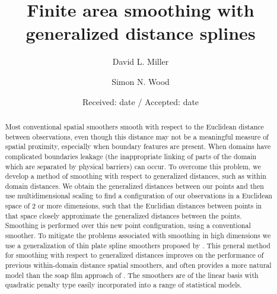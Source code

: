 \documentclass[smallextended]{svjour3}       %
\begin{document}
\title{Finite area smoothing with generalized distance splines}


\author{David L. Miller         \and
        Simon N. Wood
}



\date{Received: date / Accepted: date}


\maketitle

\begin{abstract}
Most conventional spatial smoothers smooth with respect to the Euclidean distance between observations, even though this distance may not be a meaningful measure of spatial proximity, especially when boundary features are present. When domains have complicated boundaries leakage (the inappropriate linking of parts of the domain which are separated by physical barriers) can occur. To overcome this problem, we develop a method of smoothing with respect to generalized distances, such as within domain distances. We obtain the generalized distances between our points and then use multidimensional scaling to find a configuration of our observations in a Euclidean space of 2 or more dimensions, such that the Euclidian distances between points in that space closely approximate the generalized distances between the points. Smoothing is performed over this new point configuration, using a conventional smoother. To mitigate the problems associated with smoothing in high dimensions we use a generalization of thin plate spline smoothers proposed by \cite{Duchon:1977tr}. This general method for smoothing with respect to generalized distances improves on the performance of previous within-domain distance spatial smoothers, and often provides a more natural model than the soap film approach of \cite{Wood:2008vo}. The smoothers are of the linear basis with quadratic penalty type easily incorporated into a range of statistical models.
\end{abstract}
\end{document}
